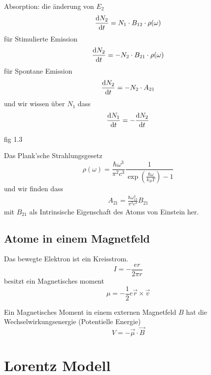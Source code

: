 \documentclass[]{scrbook}
\begin{document}
Absorption: die änderung von $E_2$
$$
\frac{\text dN_2}{\text d t} = N_1\cdot B_{12} \cdot \rho(\omega)
$$
für Stimulierte Emission
$$
\frac{\text dN_2}{\text dt} = -N_2\cdot B_{21}\cdot\rho(\omega)
$$
für Spontane Emission
$$
\frac{\text dN_2}{\text dt} = -N_2\cdot A_{21}
$$
und wir wissen über $N_1$ dass
$$
\frac{\text dN_1}{\text dt} = -\frac{\text dN_2}{\text dt}
$$

fig 1.3

Das Plank'sche Strahlungsgesetz
$$
\rho(\omega) = \frac{\hbar \omega^3}{\pi^2 c^3} \frac{1}{\exp\left(\frac{\hbar\omega}{k_BT}\right)-1}
$$
und wir finden dass
\begin{gather}
	A_{21} = \frac{\hbar\omega_{12}^3}{\pi^2 c^3} B_{21}
\end{gather}
mit $B_{21}$ als Intrinsische Eigenschaft des Atoms von Einstein her.

\subsection{Atome in einem Magnetfeld}

Das bewegte Elektron ist ein Kreisstrom.
$$
I = -\frac{er}{2\pi r}
$$
besitzt ein Magnetisches moment
$$
\mu = -\frac{1}{2}e\vec r\times \vec v
$$

Ein Magnetisches Moment in einem externen Magnetfeld $B$ hat die Wechselwirkungsenergie (Potentielle Energie)
$$
V = -\vec\mu \cdot\vec B
$$

\section{Lorentz Modell}
\end{document}
